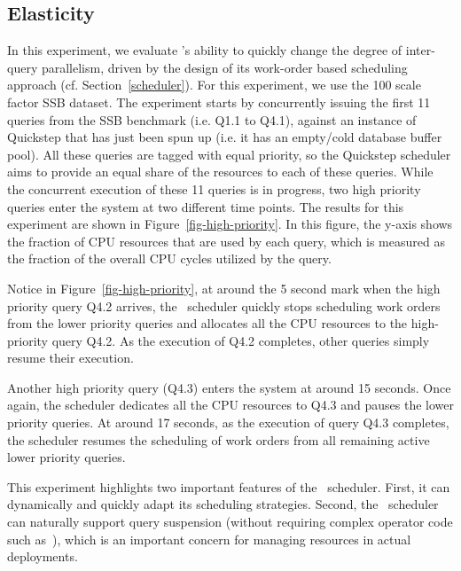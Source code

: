 \subsection{Elasticity} \label{sec:expt:elasticity}
In this experiment, we evaluate \Quickstep's ability to quickly change the degree of inter-query parallelism, driven by the design of its work-order based scheduling approach (cf. Section~\ref{scheduler}). For this experiment, we use the 100 scale factor SSB dataset. The experiment starts by concurrently issuing the first 11 queries from the SSB benchmark (i.e. Q1.1 to Q4.1), against an instance of Quickstep that has just been spun up (i.e. it has an empty/cold database buffer pool).
All these queries are tagged with equal priority, so the Quickstep scheduler aims to provide an equal share of the resources to each of these queries. While the concurrent execution of these 11 queries is in progress, two high priority queries enter the system at two different time points. The results for this experiment are shown in Figure~\ref{fig-high-priority}.
In this figure, the y-axis shows the fraction of CPU resources that are used by each query, which is measured as the fraction of the overall CPU cycles utilized by the query.

Notice in Figure~\ref{fig-high-priority}, at around the 5 second mark when the high priority query Q4.2 arrives, the \Quickstep\ scheduler quickly stops scheduling work orders from the lower priority queries and allocates all the CPU resources to the high-priority query Q4.2.
As the execution of Q4.2 completes, other queries simply resume their execution.

Another high priority query (Q4.3) enters the system at around 15 seconds.
Once again, the scheduler dedicates all the CPU resources to Q4.3 and pauses the lower priority queries.
At around 17 seconds, as the execution of query Q4.3 completes, the scheduler resumes the scheduling of work orders from all remaining active lower priority queries.

This experiment highlights two important features of the \Quickstep\ scheduler.
First, it can dynamically and quickly adapt its scheduling strategies. %
Second, the \Quickstep\ scheduler can naturally support query suspension (without requiring complex operator code such as~\cite{DavisonG94}), which is an important concern for managing resources in actual deployments.

